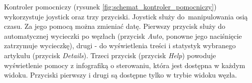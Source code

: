 
Kontroler pomocniczy (rysunek \ref{fig:schemat_kontroler_pomocniczy}) wykorzystuje joystick oraz trzy przyciski. Joystick służy do~manipulowania osią czasu. Za jego pomocą można zmieniać datę. Pierwszy przycisk służy do automatycznej wycieczki po węzłach (przycisk \textit{Auto}, ponowne jego naciśnięcie zatrzymuje wycieczkę), drugi - do wyświetlenia treści i statystyk wybranego artykułu (przycisk \textit{Details}). Trzeci przycisk (przycisk \textit{Help}) powoduje wyświetlenie pomocy z infografiką o sterowaniu, która jest dostępna w każdym widoku. Przyciski pierwszy i drugi są dostępne tylko w trybie widoku węzła.

